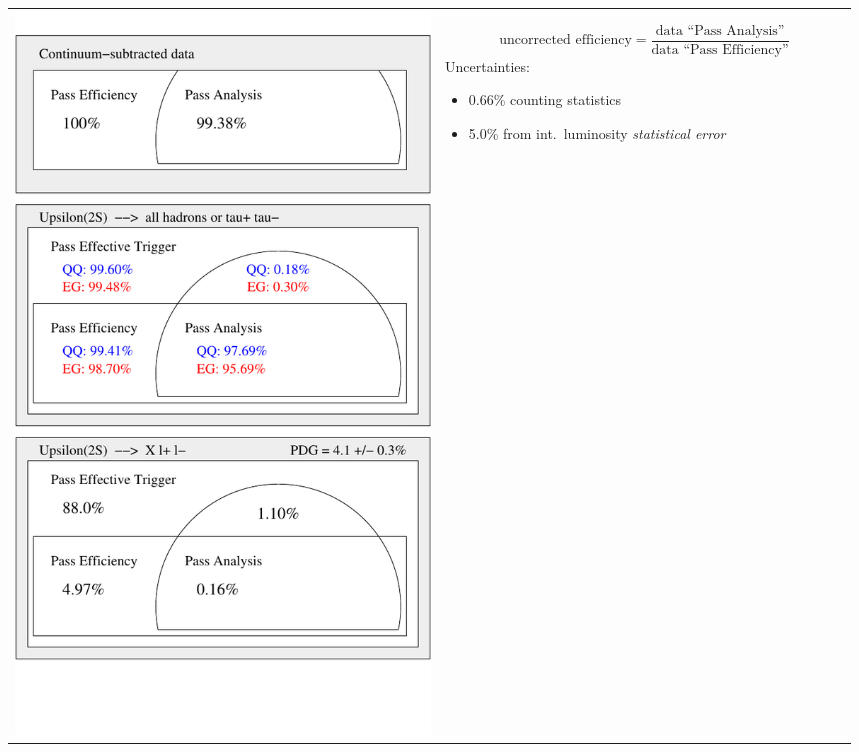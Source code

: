 \documentclass[landscape]{article}
\begin{document}
\begin{center}
  \begin{tabular}{p{0.5\linewidth} p{0.48\linewidth}}
    \begin{minipage}{\linewidth}
      \vspace{-0.4 cm}
      \includegraphics[width=\linewidth]{breakdown.pdf}
    \end{minipage} &
    \begin{minipage}{\linewidth}
      \LARGE

\vspace{-2.5 cm}
\[ \mbox{uncorrected efficiency} = \frac{\mbox{data ``Pass Analysis''}}{\mbox{data ``Pass Efficiency''}} \]
Uncertainties: 
\begin{itemize}
  \item 0.66\% counting statistics
  \item 5.0\% from int.\ luminosity {\it statistical error}
\end{itemize}


\end{minipage}
\end{tabular}
\end{center}
\end{document}
